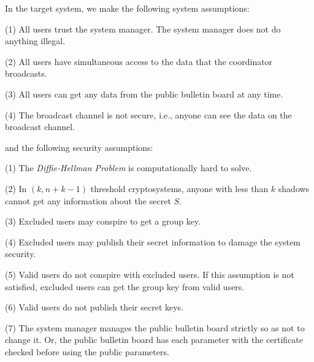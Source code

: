 \documentclass{ims9x6}
\begin{document}
In the target system, we make the following system assumptions:
\begin{arabiclist}[(2)]
\item[(1)] All users trust the system manager. The system manager
does not do anything illegal.
\item[(2)] All users have simultaneous access to the data that the
coordinator broadcasts.
\item[(3)] All users can get any data from the public bulletin board
at any time.
\item[(4)] The broadcast channel is not secure, i.e., anyone can see
the data on the broadcast channel.
\end{arabiclist}
and the following security assumptions:
\begin{arabiclist}[(2)]
\item[(1)] The {\em Diffie-Hellman Problem\/} is computationally hard
to solve.
\item[(2)] In $(k, n+k-1)$ threshold cryptosystems, anyone with less
than $k$ shadows cannot get any information about the secret $S$.
\item[(3)] Excluded users may conspire to get a group key.
\item[(4)] Excluded users may publish their secret information to
damage the system security.
\item[(5)] Valid users do not conspire with excluded users. If this
assumption is not satisfied, excluded users can get the group key from
valid users.
\item[(6)] Valid users do not publish their secret keys.
\item[(7)] The system manager manages the public bulletin board
strictly so as not to change it. Or, the public bulletin board has
each parameter with the certificate checked before using the public
parameters.
\end{arabiclist}
\end{document}
